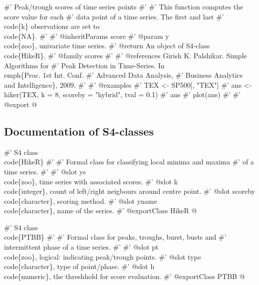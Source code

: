 \documentclass[a4paper]{article}
\begin{document}
\nwenddocs{}\endmoddef
#' Peak/trough scores of time series points
#'
#' This function computes the score value for each
#' data point of a time series. The first and last
#' \\code\{k\} observations are set to \\code\{NA\}.
#'
#' @inheritParams score
#' @param y \\code\{zoo\}, univariate time series.
#' @return An object of S4-class \\code\{HikeR\}.
#' @family scores
#'
#' @references Girish K. Palshikar. Simple Algorithms for
#' Peak Detection in Time-Series. In \\emph\{Proc. 1st Int. Conf.
#' Advanced Data Analysis,
#' Business Analytics and Intelligence\}, 2009.
#'
#' @examples
#' TEX <- SP500[, "TEX"]
#' ans <- hiker(TEX, k = 8, scoreby = "hybrid", tval = 0.1)
#' ans
#' plot(ans)
#'
#' @export
\nwendcode{}@


\subsection{Documentation of S4-classes}
\label{S5SS2}

\nwenddocs{}\endmoddef
#' S4 class \\code\{HikeR\}
#'
#' Formal class for classifying local minima and maxima
#' of a time series.
#'
#' @slot ys \\code\{zoo\}, time series with associated scores.
#' @slot k \\code\{integer\}, count of left/right neigbours around centre point.
#' @slot scoreby \\code\{character\}, scoring method.
#' @slot yname \\code\{character\}, name of the series.
#' @exportClass HikeR
\nwendcode{}@

\nwenddocs{}\endmoddef
#' S4 class \\code\{PTBB\}
#'
#' Formal class for peaks, troughs, burst, busts and
#' intermittent phase of a time series.
#'
#' @slot pt \\code\{zoo\}, logical: indicating peak/trough points.
#' @slot type \\code\{character\}, type of point/phase.
#' @slot h \\code\{numeric\}, the threshhold for score evaluation.
#' @exportClass PTBB
\nwendcode{}@
\end{document}
